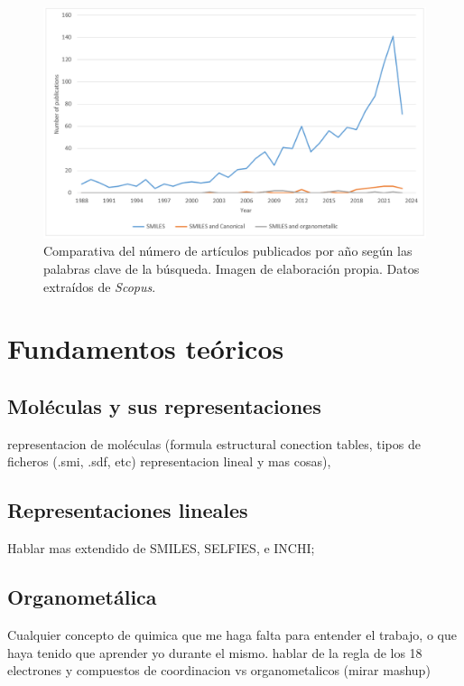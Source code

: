 \begin{figure}[h!]
        \centering
        \includegraphics[scale=0.5]{imagenes/estado_arte/revisionBibliografica.png}
        \caption{Comparativa del número de artículos publicados por año según las palabras clave de la búsqueda. Imagen de elaboración propia. Datos extraídos de \emph{Scopus}.}
        \label{fig:revisionBibliografica}
    \end{figure}


\section{Fundamentos teóricos}

\subsection{Moléculas y sus representaciones}
representacion de moléculas (formula estructural conection tables, tipos de ficheros (.smi, .sdf, etc) representacion lineal y mas cosas),

\subsection{Representaciones lineales}
Hablar mas extendido de SMILES, SELFIES, e INCHI;

\subsection{Organometálica}
Cualquier concepto de quimica que me haga falta para entender el trabajo, o que haya tenido que aprender yo durante el mismo.
hablar de la regla de los 18 electrones y compuestos de coordinacion vs organometalicos
(mirar mashup)

